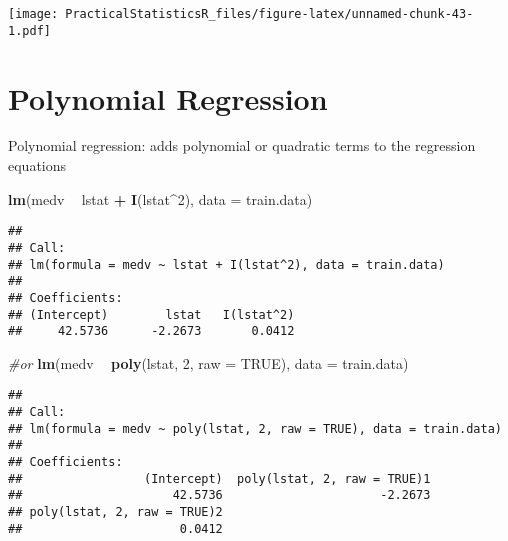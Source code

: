\documentclass[
]{article}
\newenvironment{Shaded}{\begin{snugshade}}{\end{snugshade}}
\newcommand{\CommentTok}[1]{\textcolor[rgb]{0.56,0.35,0.01}{\textit{#1}}}
\newcommand{\DataTypeTok}[1]{\textcolor[rgb]{0.13,0.29,0.53}{#1}}
\newcommand{\DecValTok}[1]{\textcolor[rgb]{0.00,0.00,0.81}{#1}}
\newcommand{\KeywordTok}[1]{\textcolor[rgb]{0.13,0.29,0.53}{\textbf{#1}}}
\newcommand{\NormalTok}[1]{#1}
\newcommand{\OperatorTok}[1]{\textcolor[rgb]{0.81,0.36,0.00}{\textbf{#1}}}
\newcommand{\OtherTok}[1]{\textcolor[rgb]{0.56,0.35,0.01}{#1}}
\newcommand{\StringTok}[1]{\textcolor[rgb]{0.31,0.60,0.02}{#1}}
\begin{document}
\texttt{[image: PracticalStatisticsR\_files/figure-latex/unnamed-chunk-43-1.pdf]}

\hypertarget{polynomial-regression}{%
\section{Polynomial Regression}\label{polynomial-regression}}

Polynomial regression: adds polynomial or quadratic terms to the
regression equations

\begin{Shaded}
\begin{Highlighting}[]
\KeywordTok{lm}\NormalTok{(medv }\OperatorTok{~}\StringTok{ }\NormalTok{lstat }\OperatorTok{+}\StringTok{ }\KeywordTok{I}\NormalTok{(lstat}\OperatorTok{^}\DecValTok{2}\NormalTok{), }\DataTypeTok{data =}\NormalTok{ train.data)}
\end{Highlighting}
\end{Shaded}

\begin{verbatim}
## 
## Call:
## lm(formula = medv ~ lstat + I(lstat^2), data = train.data)
## 
## Coefficients:
## (Intercept)        lstat   I(lstat^2)  
##     42.5736      -2.2673       0.0412
\end{verbatim}

\begin{Shaded}
\begin{Highlighting}[]
\CommentTok{#or}
\KeywordTok{lm}\NormalTok{(medv }\OperatorTok{~}\StringTok{ }\KeywordTok{poly}\NormalTok{(lstat, }\DecValTok{2}\NormalTok{, }\DataTypeTok{raw =} \OtherTok{TRUE}\NormalTok{), }\DataTypeTok{data =}\NormalTok{ train.data)}
\end{Highlighting}
\end{Shaded}

\begin{verbatim}
## 
## Call:
## lm(formula = medv ~ poly(lstat, 2, raw = TRUE), data = train.data)
## 
## Coefficients:
##                 (Intercept)  poly(lstat, 2, raw = TRUE)1  
##                     42.5736                      -2.2673  
## poly(lstat, 2, raw = TRUE)2  
##                      0.0412
\end{verbatim}

\begin{Shaded}
\end{Shaded}
\end{document}
